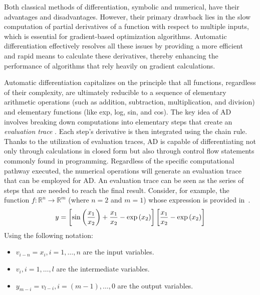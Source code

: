 Both classical methods of differentiation, symbolic and numerical, have their
advantages and disadvantages. However, their primary drawback lies in the slow
computation of partial derivatives of a function with respect to multiple
inputs, which is essential for gradient-based optimization
algorithms.
Automatic differentiation effectively resolves all these issues by providing a
more efficient and rapid means to calculate these derivatives, thereby
enhancing the performance of algorithms that rely heavily on gradient
calculations.

Automatic differentiation capitalizes on the principle that all functions,
regardless of their complexity, are ultimately reducible to a sequence of
elementary arithmetic operations (such as addition, subtraction, multiplication,
and division) and elementary functions (like exp, log, sin, and cos). The key
idea of AD involves breaking down computations into elementary steps that create
an \emph{evaluation trace} . Each step’s
derivative is then integrated using the chain rule. Thanks to the utilization of
evaluation traces, AD is capable of differentiating not only through
calculations in closed form but also through control flow statements commonly
found in programming. Regardless of the specific computational pathway executed,
the numerical operations will generate an evaluation trace that can be employed
for AD.
An evaluation trace can be seen as the series of steps that are needed to reach
the final result. Consider, for example, the function $f: \mathbb{R}^n \to
\mathbb{R}^m$ (where $n=2$ and $m=1$) whose expression is provided
in~.
\begin{equation}
\labeq{2_5}
    y=\left[\sin \left(\frac{x_{1}}{x_{2}}\right)+\frac{x_{1}}{x_{2}}-\exp
    \left(x_{2}\right)\right] \left[\frac{x_{1}}{x_{2}}-\exp
    \left(x_{2}\right)\right]
\end{equation}
Using the following notation:
\begin{itemize}
    \item $v_{i-n} = x_i, i = 1, \dots, n$ are the input variables.
    \item $v_{i}, i=1, \dots, l$ are the intermediate variables.
    \item $y_{m-i} = v_{l-i}, i=(m-1), \dots, 0$ are the output variables.
\end{itemize}
